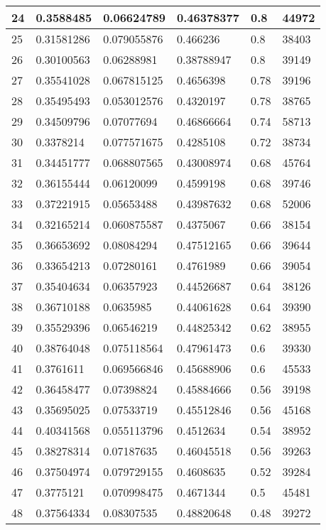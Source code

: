 \begin{longtable}{|l|l|l|l|l|l|}
24 & 0.3588485 & 0.06624789 & 0.46378377 & 0.8 & 44972 \\ \hline 
25 & 0.31581286 & 0.079055876 & 0.466236 & 0.8 & 38403 \\ \hline 
26 & 0.30100563 & 0.06288981 & 0.38788947 & 0.8 & 39149 \\ \hline 
27 & 0.35541028 & 0.067815125 & 0.4656398 & 0.78 & 39196 \\ \hline 
28 & 0.35495493 & 0.053012576 & 0.4320197 & 0.78 & 38765 \\ \hline 
29 & 0.34509796 & 0.07077694 & 0.46866664 & 0.74 & 58713 \\ \hline 
30 & 0.3378214 & 0.077571675 & 0.4285108 & 0.72 & 38734 \\ \hline 
31 & 0.34451777 & 0.068807565 & 0.43008974 & 0.68 & 45764 \\ \hline 
32 & 0.36155444 & 0.06120099 & 0.4599198 & 0.68 & 39746 \\ \hline 
33 & 0.37221915 & 0.05653488 & 0.43987632 & 0.68 & 52006 \\ \hline 
34 & 0.32165214 & 0.060875587 & 0.4375067 & 0.66 & 38154 \\ \hline 
35 & 0.36653692 & 0.08084294 & 0.47512165 & 0.66 & 39644 \\ \hline 
36 & 0.33654213 & 0.07280161 & 0.4761989 & 0.66 & 39054 \\ \hline 
37 & 0.35404634 & 0.06357923 & 0.44526687 & 0.64 & 38126 \\ \hline 
38 & 0.36710188 & 0.0635985 & 0.44061628 & 0.64 & 39390 \\ \hline 
39 & 0.35529396 & 0.06546219 & 0.44825342 & 0.62 & 38955 \\ \hline 
40 & 0.38764048 & 0.075118564 & 0.47961473 & 0.6 & 39330 \\ \hline 
41 & 0.3761611 & 0.069566846 & 0.45688906 & 0.6 & 45533 \\ \hline 
42 & 0.36458477 & 0.07398824 & 0.45884666 & 0.56 & 39198 \\ \hline 
43 & 0.35695025 & 0.07533719 & 0.45512846 & 0.56 & 45168 \\ \hline 
44 & 0.40341568 & 0.055113796 & 0.4512634 & 0.54 & 38952 \\ \hline 
45 & 0.38278314 & 0.07187635 & 0.46045518 & 0.56 & 39263 \\ \hline 
46 & 0.37504974 & 0.079729155 & 0.4608635 & 0.52 & 39284 \\ \hline 
47 & 0.3775121 & 0.070998475 & 0.4671344 & 0.5 & 45481 \\ \hline 
48 & 0.37564334 & 0.08307535 & 0.48820648 & 0.48 & 39272 \\ \hline 

\end{longtable}

